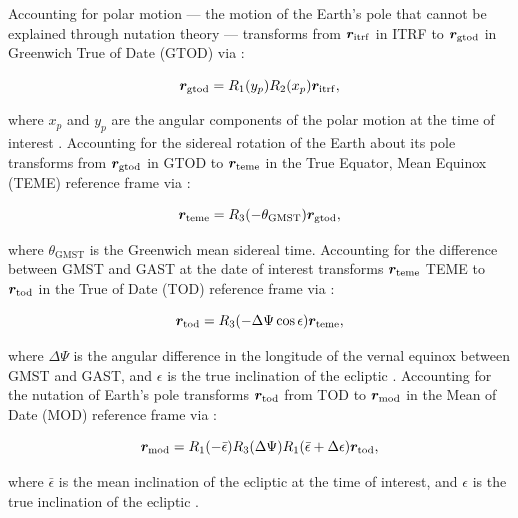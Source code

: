 Accounting for polar motion --- the motion of the Earth's pole that cannot be explained through nutation theory --- transforms from $\bm{r}_\mathrm{itrf}$ in ITRF to $\bm{r}_\mathrm{gtod}$ in Greenwich True of Date (GTOD) via \cite{vallado4ed}:

\begin{equation} \label{eq:itrf_to_gtod}
  \bm{r}_\mathrm{gtod} = R_1(y_p) R_2(x_p) \bm{r}_\mathrm{itrf},
\end{equation}

where $x_p$ and $y_p$ are the angular components of the polar motion at the time of interest \cite{frueh2019notes}. Accounting for the sidereal rotation of the Earth about its pole transforms from $\bm{r}_\mathrm{gtod}$ in GTOD to $\bm{r}_\mathrm{teme}$ in the True Equator, Mean Equinox (TEME) reference frame via \cite{frueh2019notes}:

\begin{equation} \label{eq:gtod_to_teme}
  \bm{r}_\mathrm{teme} = R_3(-\theta_\mathrm{GMST}) \bm{r}_\mathrm{gtod},
\end{equation}

where $\theta_\mathrm{GMST}$ is the Greenwich mean sidereal time. Accounting for the difference between GMST and GAST at the date of interest transforms $\bm{r}_\mathrm{teme}$ TEME to $\bm{r}_\mathrm{tod}$ in the True of Date (TOD) reference frame via \cite{vallado4ed}:

\begin{equation} \label{eq:teme_to_tod}
  \bm{r}_\mathrm{tod} = R_3(-\Delta \Psi \cos \epsilon) \bm{r}_\mathrm{teme},
\end{equation}

where $\Delta \Psi$ is the angular difference in the longitude of the vernal equinox between GMST and GAST, and $\epsilon$ is the true inclination of the ecliptic \cite{vallado4ed}. Accounting for the nutation of Earth's pole transforms $\bm{r}_\mathrm{tod}$ from TOD to $\bm{r}_\mathrm{mod}$ in the Mean of Date (MOD) reference frame via \cite{vallado4ed}:

\begin{equation} \label{eq:tod_to_mod}
  \bm{r}_\mathrm{mod} = R_1(-\bar{\epsilon}) R_3(\Delta\Psi) R_1(\bar{\epsilon} + \Delta\epsilon) \bm{r}_\mathrm{tod},
\end{equation}

where $\bar{\epsilon}$ is the mean inclination of the ecliptic at the time of interest, and $\epsilon$ is the true inclination of the ecliptic \cite{vallado4ed}.

